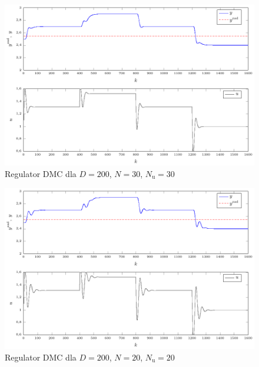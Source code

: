 \begin{figure}[tb] 
\centering 
\includegraphics[scale=1]{rysunki/zapisz_pdf/DMC_D=200.000_N=30.00_Nu=30.00.pdf} 
\caption{Regulator DMC dla $D=200$, $N=30$, $N_{\mathrm{u}}=30$} 
\label{r_pgfplots_DMC_D=200.000_N=30.00_Nu=30.00} 
\end{figure}

\begin{figure}[tb] 
\centering 
\includegraphics[scale=1]{rysunki/zapisz_pdf/DMC_D=200.000_N=20.00_Nu=20.00.pdf} 
\caption{Regulator DMC dla $D=200$, $N=20$, $N_{\mathrm{u}}=20$} 
\label{r_pgfplots_DMC_D=200.000_N=20.00_Nu=20.00} 
\end{figure}

